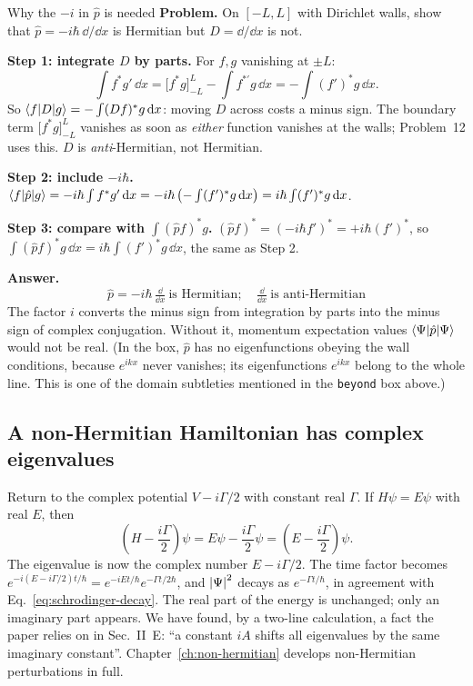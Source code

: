 \begin{sample}{Why the $-i$ in $\hat p$ is needed}
\textbf{Problem.} On $[-L,L]$ with Dirichlet walls, show that $\hat p=-i\hbar\,\dd/\dd x$ is Hermitian but $D=\dd/\dd x$ is not.

\textbf{Step 1: integrate $D$ by parts.} For $f,g$ vanishing at $\pm L$:
\[
\int f^*g'\,\dd x=\Big[f^*g\Big]_{-L}^L-\int f^{*\prime}g\,\dd x=-\int(f')^*g\,\dd x.
\]
So $\langle f|D|g\rangle=-\int(Df)^*g\,\mathrm{d} x$: moving $D$ across costs a minus sign. The boundary term $\Big[f^*g\Big]_{-L}^L$ vanishes as soon as \emph{either} function vanishes at the walls; Problem~12 uses this. $D$ is \emph{anti}-Hermitian, not Hermitian.

\textbf{Step 2: include $-i\hbar$.} $\langle f|\hat p|g\rangle=-i\hbar\int f^*g'\,\mathrm{d} x=-i\hbar\left(-\int(f')^*g\,\mathrm{d} x\right)=i\hbar\int(f')^*g\,\mathrm{d} x$.

\textbf{Step 3: compare with $\int(\hat pf)^*g$.} $(\hat pf)^*=(-i\hbar f')^*=+i\hbar(f')^*$, so $\int(\hat pf)^*g\,\dd x=i\hbar\int(f')^*g\,\dd x$, the same as Step 2.

\textbf{Answer.} \[\boxed{\hat p=-i\hbar\,\tfrac{\dd}{\dd x}\ \text{is Hermitian};\quad \tfrac{\dd}{\dd x}\ \text{is anti-Hermitian}}\]
The factor $i$ converts the minus sign from integration by parts into the minus sign of complex conjugation. Without it, momentum expectation values $\langle \Psi|\hat p|\Psi\rangle$ would not be real. (In the box, $\hat p$ has no eigenfunctions obeying the wall conditions, because $e^{ikx}$ never vanishes; its eigenfunctions $e^{ikx}$ belong to the whole line. This is one of the domain subtleties mentioned in the \texttt{beyond} box above.)
\end{sample}

\subsection{A non-Hermitian Hamiltonian has complex eigenvalues}

Return to the complex potential $V-i\Gamma/2$ with constant real $\Gamma$. If $H\psi=E\psi$ with real $E$, then
\[
\left(H-\frac{i\Gamma}2\right)\psi=E\psi-\frac{i\Gamma}2\psi=\left(E-\frac{i\Gamma}{2}\right)\psi.
\]
The eigenvalue is now the complex number $E-i\Gamma/2$. The time factor becomes $e^{-i(E-i\Gamma/2)t/\hbar}=e^{-iEt/\hbar}e^{-\Gamma t/2\hbar}$, and $\left\lvert \Psi\right\rvert^2$ decays as $e^{-\Gamma t/\hbar}$, in agreement with Eq.~\eqref{eq:schrodinger-decay}. The real part of the energy is unchanged; only an imaginary part appears. We have found, by a two-line calculation, a fact the paper relies on in Sec.~II~E: ``a constant $iA$ shifts all eigenvalues by the same imaginary constant''. Chapter~\ref{ch:non-hermitian} develops non-Hermitian perturbations in full.

